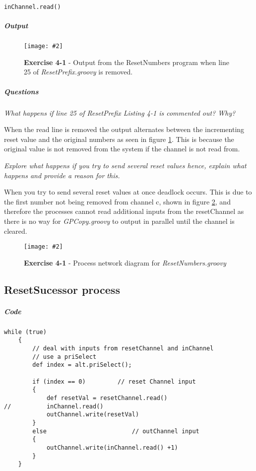 \documentclass[10pt, a4paper]{article}
\newcommand{\figuremacro}[5]{
    \begin{figure}[#1]
        \centering
        \texttt{[image: \#2]}
        \caption[#3]{\textbf{#3}#4}
        \label{fig:#2}
    \end{figure}
}
\begin{document}
	\begin{lstlisting}[caption = "Line 25 of ResetPrefix.groovy"]
		inChannel.read()	\end{lstlisting}
		
	\subparagraph{Output} \hfill
	
	\figuremacro{H}{resetNum}{Exercise 4-1}{ - Output from the ResetNumbers program when line 25 of \textit{ResetPrefix.groovy} is removed.}{0.5}
	
	\subparagraph{Questions} \hfill
	
	\textit{What happens if line {25} of ResetPrefix Listing 4-1 is commented out? Why?}
	
	When the read line is removed the output alternates between the incrementing reset value and the original numbers as seen in figure \ref{fig:resetNum}. This is because the original value is not removed from the system if the channel is not read from.
		
	\textit{Explore what happens if you try to send several reset values hence, explain what happens and provide a reason for this.}
	
	When you try to send several reset values at once deadlock occurs. This is due to the first number not being removed from channel c, shown in figure \ref{fig:resetPre}, and therefore the processes cannot read additional inputs from the resetChannel as there is no way for \textit{GPCopy.groovy} to output in parallel until the channel is cleared.
	
	\figuremacro{H}{resetPre}{Exercise 4-1}{ - Process network diagram for \textit{ResetNumbers.groovy}}{0.7}
	
	\subsection{ResetSucessor process}

	\subparagraph{Code} \hfil
	
	
	\begin{lstlisting}[caption = "ResetSucessor.groovy"]
	while (true)
	{
		// deal with inputs from resetChannel and inChannel
		// use a priSelect
		def index = alt.priSelect();
		
		if (index == 0) 		// reset Channel input
		{
			def resetVal = resetChannel.read()
//			inChannel.read()
			outChannel.write(resetVal)
		}
		else						// outChannel input
		{
			outChannel.write(inChannel.read() +1)				
		}
	}	\end{lstlisting}
	
\end{document}
